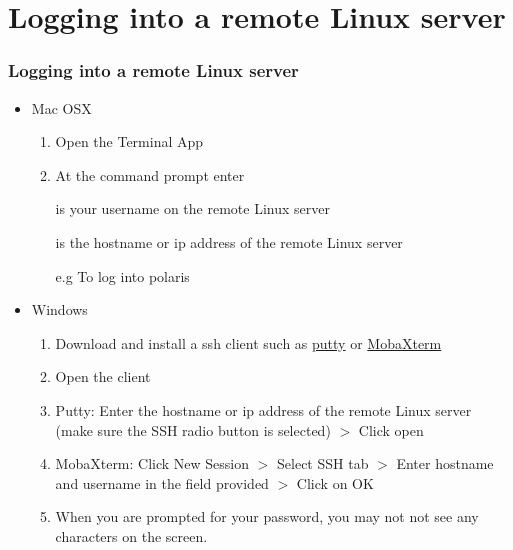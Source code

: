 \documentclass[10pt,t]{beamer}
\begin{document}
\section*{Logging into a remote Linux server}
\begin{frame}[fragile]
  \frametitle{Logging into a remote Linux server}
  \begin{itemize}
    \item Mac OSX
    \begin{enumerate}
      \item Open the Terminal App
      \item At the command prompt enter 
      \item[]  is your username on the remote Linux server
      \item[]  is the hostname or ip address of the remote Linux server
      \item[e.g] To log into polaris  
    \end{enumerate}
    \item Windows
    \begin{enumerate}
      \item Download and install a ssh client such as \href{http://www.putty.org/}{putty} or \href{http://mobaxterm.mobatek.net/}{MobaXterm}
      \item Open the client
      \item Putty: Enter the hostname or ip address of the remote Linux server (make sure the SSH radio button is selected) $>$ Click open
      \item MobaXterm: Click New Session $>$ Select SSH tab $>$ Enter hostname and username in the field provided $>$ Click on OK
      \item When you are prompted for your password, you may not not see any characters on the screen.
    \end{enumerate}
  \end{itemize}
\end{frame}
\end{document}
